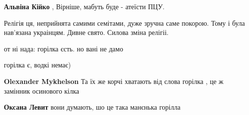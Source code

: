 \begin{itemize}
\begin{itemize}
\textbf{Альвіна Кійко} , Вірніше, мабуть буде - атеїсти ПЦУ.
\end{itemize}

 

Релігія ця, неприйнята самими семітами, дуже зручна саме покорою. Тому і була
нав'язана украінцям. Дивне свято. Силова зміна релігіі.


 

от ні нада: горілка єсть. но вані не дамо \Smiley[1.0][yellow]

\begin{itemize}
 
горілка є, водкі немає)

 
\textbf{Olexander Mykhelson} Та їх же корчі хватають від слова горілка , це ж замінник осинового кілка

 

\textbf{Оксана Левит} вони думають, шо це така манєнька горілла \Smiley[1.0][yellow]

 

\end{itemize}
\end{itemize}
